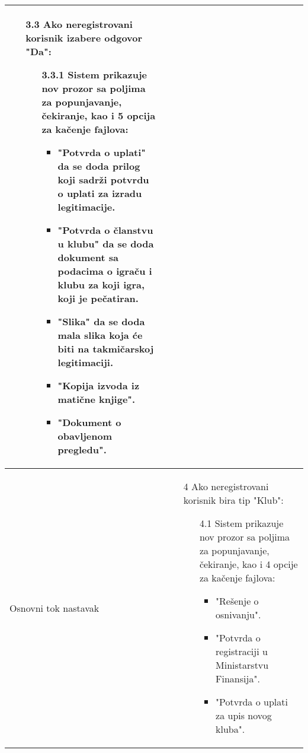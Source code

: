 \documentclass{article}
\begin{document}
\begin{longtable}{| p{} | p{} |}
\begin{enumerate}
\begin{enumerate}
\begin{enumerate}
                            \end{enumerate}
                            \item[3.3] Ako neregistrovani korisnik izabere odgovor "Da":
                            \begin{enumerate}
                                \item[3.3.1] Sistem prikazuje nov prozor sa poljima za popunjavanje, čekiranje, kao i 5 opcija za kačenje fajlova:
                                \begin{itemize}
                                    \item "Potvrda o uplati" da se doda prilog koji sadrži potvrdu o uplati za izradu legitimacije.
                                    \item "Potvrda o članstvu u klubu" da se doda dokument sa podacima o igraču i klubu za koji igra, koji je pečatiran.
                                    \item "Slika" da se doda mala slika koja će biti na takmičarskoj legitimaciji.
                                    \item "Kopija izvoda iz matične knjige".
                                    \item "Dokument o obavljenom pregledu".
                                \end{itemize}  
                            \end{enumerate}
                        \end{enumerate}
                \end{enumerate}\\
            \hline
                Osnovni tok nastavak & \begin{enumerate}
                    \item[4] Ako neregistrovani korisnik bira tip "Klub":
                        \begin{enumerate}
                            \item[4.1] Sistem prikazuje nov prozor sa poljima za popunjavanje, čekiranje, kao i 4 opcije za kačenje fajlova:
                                \begin{itemize}
                                    \item "Rešenje o osnivanju".
                                    \item "Potvrda o registraciji u Ministarstvu Finansija".
                                    \item "Potvrda o uplati za upis novog kluba".

\end{itemize}
\end{enumerate}
\end{enumerate}
\end{longtable}
\end{document}
